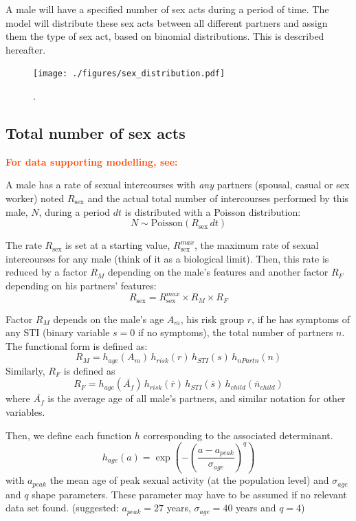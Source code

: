 \documentclass[11pt, onecolumn]{article}
\newcommand{\warning}[1]{\textbf{\textcolor{OrangeRed}{#1}}}
\begin{document}
A male will have a specified number of sex acts during a period of time. The model will distribute these sex acts between all different partners and assign them the type of sex act, based on binomial distributions. This is described hereafter.

\begin{figure}[ht]
\centering
    \texttt{[image: ./figures/sex\_distribution.pdf]}
\caption{.}
\label{fig:sexDistribution}
\end{figure}


\subsection{Total number of sex acts}

\warning{For data supporting modelling, see:\cite{BREWIS:2005gk}}

A male has a rate of sexual intercourses with \emph{any} partners (spousal, casual or sex worker) noted $R_{\mathrm{sex}}$ and the actual total number of intercourses performed by this male, $N$, during a period $dt$ is distributed with a Poisson distribution: 
$$N\sim \mathrm{Poisson}(R_{\mathrm{sex}}\, dt)$$

The rate $R_{\mathrm{sex}}$ is set at a starting value,  $R_{\mathrm{sex}}^{max}$, the maximum rate of sexual intercourses for any male (think of it as a biological limit). Then, this rate is reduced by a factor $R_M$ depending on the male's features  and another factor $R_F$ depending on his partners' features:
$$R_{\mathrm{sex}} = R_{\mathrm{sex}}^{max} \times R_{M} \times R_{F} $$

Factor $R_M$ depends on the male's age $A_m$, his risk group $r$, if he has symptoms of any STI (binary variable $s=0$ if no symptoms), the total number of partners $n$. The functional form is defined as:
$$R_M= h_{age}(A_m)  \, h_{risk}(r)  \,h_{STI}(s) \,h_{nPartn}(n) $$
Similarly, $R_F$ is defined as
$$R_F=  h_{age}(\bar{A_f})  \, h_{risk}(\bar{r})  \,h_{STI}(\bar{s}) \,h_{child}(\bar{n}_{child})$$
where $\bar{A_f}$ is the average age of all male's partners, and similar notation for other variables.

Then, we define each function $h$ corresponding to the associated determinant.
$$h_{age}(a) = \exp \left(-\left(\frac{a-a_{peak}}{\sigma_{age}}\right)^q \right)$$
with $a_{peak}$ the mean age of peak sexual activity (at the population level) and $\sigma_{age}$ and $q$ shape parameters. These parameter may have to be assumed if no relevant data set found. (suggested: $a_{peak}=27$ years, $\sigma_{age}=40$ years and $q=4$) 
\end{document}

